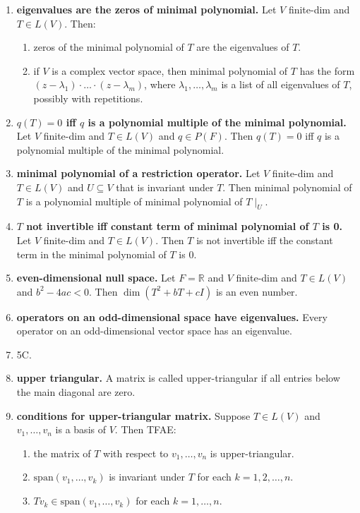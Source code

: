 \begin{enumerate}
	\item \textbf{eigenvalues are the zeros of minimal polynomial. } Let $V$ finite-dim and $T \in L(V)$. Then: 
	\begin{enumerate}
		\item zeros of the minimal polynomial of $T$ are the eigenvalues of $T$. 
		\item if $V$ is a complex vector space, then minimal polynomial of $T$ has the form $(z-\lambda_1) \cdot \dots \cdot (z-\lambda_m)$, where $\lambda_1,\dots,\lambda_m$ is a list of all eigenvalues of $T$, possibly with repetitions. 
	\end{enumerate}
	\item \textbf{$q(T)=0$ iff $q$ is a polynomial multiple of the minimal polynomial. } Let $V$ finite-dim and $T \in L(V)$ and $q \in P(F)$. Then $q(T)=0$ iff $q$ is a polynomial multiple of the minimal polynomial. 
	\item \textbf{minimal polynomial of a restriction operator. } Let $V$ finite-dim and $T \in L(V)$ and $U \subseteq V$ that is invariant under $T$. Then minimal polynomial of $T$ is a polynomial multiple of minimal polynomial of $T \mid_U$. 
	\item \textbf{$T$ not invertible iff constant term of minimal polynomial of $T$ is 0. } Let $V$ finite-dim and $T \in L(V)$. Then $T$ is not invertible iff the constant term in the minimal polynomial of $T$ is 0. 
	\item \textbf{even-dimensional null space. } Let $F = \mathbb{R}$ and $V$ finite-dim and $T \in L(V)$ and $b^2-4ac < 0$. Then $\dim(T^2 + bT + cI)$ is an even number. 
	\item \textbf{operators on an odd-dimensional space have eigenvalues. } Every operator on an odd-dimensional vector space has an eigenvalue. 
	\item 5C. 
	\item \textbf{upper triangular. } A matrix is called upper-triangular if all entries below the main diagonal are zero. 
	\item \textbf{conditions for upper-triangular matrix. } Suppose $T \in L(V)$ and $v_1,\dots,v_n$ is a basis of $V$. Then TFAE: 
	\begin{enumerate}
		\item the matrix of $T$ with respect to $v_1,\dots,v_n$ is upper-triangular. 
		\item $\textrm{span}(v_1,\dots,v_k)$ is invariant under $T$ for each $k = 1,2,\dots,n$. 
		\item $Tv_k \in \textrm{span}(v_1,\dots,v_k)$ for each $k=1,\dots,n$. 

\end{enumerate}
\end{enumerate}
